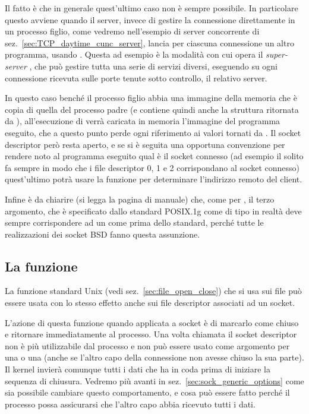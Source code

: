 Il fatto è che in generale quest'ultimo caso non è sempre possibile.  In
particolare questo avviene quando il server, invece di gestire la connessione
direttamente in un processo figlio, come vedremo nell'esempio di server
concorrente di sez.~\ref{sec:TCP_daytime_cunc_server}, lancia per ciascuna
connessione un altro programma, usando . Questa ad esempio è la
modalità con cui opera il \textsl{super-server} , che può gestire
tutta una serie di servizi diversi, eseguendo su ogni connessione ricevuta
sulle porte tenute sotto controllo, il relativo server.

In questo caso benché il processo figlio abbia una immagine della memoria che
è copia di quella del processo padre (e contiene quindi anche la struttura
ritornata da ), all'esecuzione di  verrà caricata in
memoria l'immagine del programma eseguito, che a questo punto perde ogni
riferimento ai valori tornati da .  Il socket descriptor però
resta aperto, e se si è seguita una opportuna convenzione per rendere noto al
programma eseguito qual è il socket connesso (ad esempio il solito
 fa sempre in modo che i file descriptor 0, 1 e 2 corrispondano al
socket connesso) quest'ultimo potrà usare la funzione  per
determinare l'indirizzo remoto del client.

Infine è da chiarire (si legga la pagina di manuale) che, come per
, il terzo argomento, che è specificato dallo standard POSIX.1g
come di tipo  in realtà deve sempre corrispondere ad un
 come prima dello standard, perché tutte le realizzazioni dei
socket BSD fanno questa assunzione.


\subsection{La funzione }
\label{sec:TCP_func_close}

La funzione standard Unix  (vedi sez.~\ref{sec:file_open_close})
che si usa sui file può essere usata con lo stesso effetto anche sui file
descriptor associati ad un socket.

L'azione di questa funzione quando applicata a socket è di marcarlo come
chiuso e ritornare immediatamente al processo. Una volta chiamata il socket
descriptor non è più utilizzabile dal processo e non può essere usato come
argomento per una  o una  (anche se l'altro capo della
connessione non avesse chiuso la sua parte).  Il kernel invierà comunque tutti
i dati che ha in coda prima di iniziare la sequenza di chiusura.  Vedremo più
avanti in sez.~\ref{sec:sock_generic_options} come sia possibile cambiare
questo comportamento, e cosa può essere fatto perché il processo possa
assicurarsi che l'altro capo abbia ricevuto tutti i dati.

